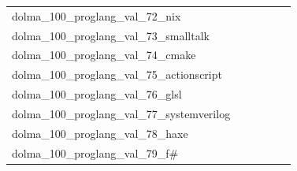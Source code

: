 \documentclass[dvipsnames]{article}
\begin{document}
\begin{appendix}
{\begin{longtable}{m{6cm}m{1.7cm}m{1.7cm}m{1.7cm}m{1.7cm}m{1.7cm}}
	dolma\_100\_proglang\_val\_72\_nix  & \colorbox[HTML]{77c578}{\makebox[\mywidth][c]{7.80}} & \colorbox[HTML]{96d385}{\makebox[\mywidth][c]{7.84}} & \colorbox[HTML]{ffffe5}{\makebox[\mywidth][c]{9.03}} & \colorbox[HTML]{b0de8f}{\makebox[\mywidth][c]{7.88}} & \colorbox[HTML]{90d082}{\makebox[\mywidth][c]{7.83}}\\
	dolma\_100\_proglang\_val\_73\_smalltalk  & \colorbox[HTML]{9dd687}{\makebox[\mywidth][c]{9.32}} & \colorbox[HTML]{d4eea0}{\makebox[\mywidth][c]{9.61}} & \colorbox[HTML]{ffffe5}{\makebox[\mywidth][c]{12.60}} & \colorbox[HTML]{bde395}{\makebox[\mywidth][c]{9.47}} & \colorbox[HTML]{77c578}{\makebox[\mywidth][c]{9.20}}\\
	dolma\_100\_proglang\_val\_74\_cmake  & \colorbox[HTML]{f9fdc9}{\makebox[\mywidth][c]{1.87}} & \colorbox[HTML]{f4fab6}{\makebox[\mywidth][c]{1.86}} & \colorbox[HTML]{ffffe5}{\makebox[\mywidth][c]{2.02}} & \colorbox[HTML]{ddf1a6}{\makebox[\mywidth][c]{1.84}} & \colorbox[HTML]{77c578}{\makebox[\mywidth][c]{1.81}}\\
	dolma\_100\_proglang\_val\_75\_actionscript  & \colorbox[HTML]{77c578}{\makebox[\mywidth][c]{2.45}} & \colorbox[HTML]{eff8b3}{\makebox[\mywidth][c]{2.54}} & \colorbox[HTML]{ffffe5}{\makebox[\mywidth][c]{2.88}} & \colorbox[HTML]{87cc7f}{\makebox[\mywidth][c]{2.46}} & \colorbox[HTML]{9ad486}{\makebox[\mywidth][c]{2.46}}\\
	dolma\_100\_proglang\_val\_76\_glsl  & \colorbox[HTML]{edf8b2}{\makebox[\mywidth][c]{2.40}} & \colorbox[HTML]{f6fbb8}{\makebox[\mywidth][c]{2.42}} & \colorbox[HTML]{ffffe5}{\makebox[\mywidth][c]{2.72}} & \colorbox[HTML]{c2e698}{\makebox[\mywidth][c]{2.36}} & \colorbox[HTML]{77c578}{\makebox[\mywidth][c]{2.32}}\\
	dolma\_100\_proglang\_val\_77\_systemverilog  & \colorbox[HTML]{77c578}{\makebox[\mywidth][c]{2.53}} & \colorbox[HTML]{f0f9b4}{\makebox[\mywidth][c]{2.66}} & \colorbox[HTML]{ffffe5}{\makebox[\mywidth][c]{3.17}} & \colorbox[HTML]{bee496}{\makebox[\mywidth][c]{2.58}} & \colorbox[HTML]{9fd688}{\makebox[\mywidth][c]{2.55}}\\
	dolma\_100\_proglang\_val\_78\_haxe  & \colorbox[HTML]{77c578}{\makebox[\mywidth][c]{2.74}} & \colorbox[HTML]{e1f3a9}{\makebox[\mywidth][c]{2.81}} & \colorbox[HTML]{ffffe5}{\makebox[\mywidth][c]{3.20}} & \colorbox[HTML]{bee496}{\makebox[\mywidth][c]{2.77}} & \colorbox[HTML]{a9db8c}{\makebox[\mywidth][c]{2.76}}\\
	dolma\_100\_proglang\_val\_79\_f\#  & \colorbox[HTML]{7fc97b}{\makebox[\mywidth][c]{2.89}} & \colorbox[HTML]{eff8b3}{\makebox[\mywidth][c]{3.02}} & \colorbox[HTML]{ffffe5}{\makebox[\mywidth][c]{3.53}} & \colorbox[HTML]{bbe395}{\makebox[\mywidth][c]{2.93}} & \colorbox[HTML]{77c578}{\makebox[\mywidth][c]{2.88}}\\

\end{longtable}}
\end{appendix}
\end{document}
